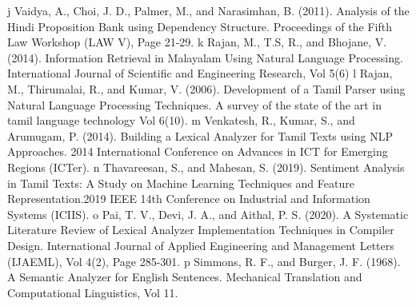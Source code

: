 \documentclass[12pt,a4paper,titlepage]{report}
\begin{document}
\begin{thebibliography}{99}
		\bibitem j Vaidya, A., Choi, J. D., Palmer, M., and Narasimhan, B. (2011). Analysis of the Hindi
		Proposition Bank using Dependency Structure. Proceedings of the Fifth Law Workshop
		(LAW V), Page 21-29.
		\bibitem k Rajan, M., T.S, R., and Bhojane, V. (2014). Information Retrieval in Malayalam Using Natural
		Language Processing. International Journal of Scientific and Engineering Research, Vol 5(6)
		\bibitem l Rajan, M., Thirumalai, R., and Kumar, V. (2006). Development of a Tamil Parser using
		Natural Language Processing Techniques. A survey of the state of the art in tamil language
		technology Vol 6(10).
		\bibitem m Venkatesh, R., Kumar, S., and Arumugam, P. (2014). Building a Lexical Analyzer for Tamil
		Texts using NLP Approaches. 2014 International Conference on Advances in ICT for Emerging
		Regions (ICTer).
		\bibitem n Thavareesan, S., and Mahesan, S. (2019). Sentiment Analysis in Tamil Texts: A Study on
		Machine Learning Techniques and Feature Representation.2019 IEEE 14th Conference on
		Industrial and Information Systems (ICIIS).
		\bibitem o Pai, T. V., Devi, J. A., and Aithal, P. S. (2020). A Systematic Literature Review of Lexical
		Analyzer Implementation Techniques in Compiler Design. International Journal of Applied
		Engineering and Management Letters (IJAEML), Vol 4(2), Page 285-301.
		\bibitem p Simmons, R. F., and Burger, J. F. (1968). A Semantic Analyzer for English Sentences.
		Mechanical Translation and Computational Linguistics, Vol 11.
		
		
	\end{thebibliography}
	
	
	
	
\end{document}
